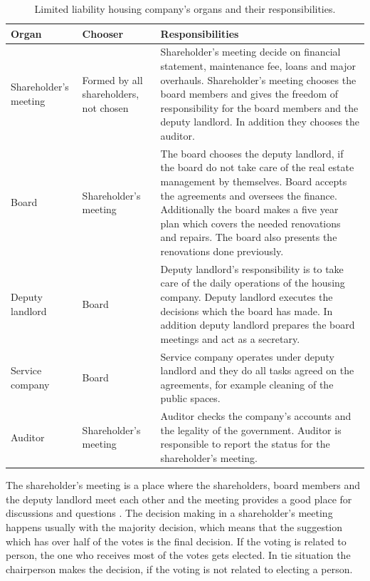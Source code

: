 \begin{table}
\begin{tabular}{|p{2.5cm}|p{2.5cm}|p{6.4cm}|} 
\hline %
\textbf{Organ} & \textbf{Chooser}  & \textbf{Responsibilities} \\ 
\hline 
Shareholder's meeting & Formed by all shareholders, not chosen & Shareholder's meeting decide on financial statement, maintenance fee, loans and major overhauls. Shareholder's meeting chooses the board members and gives the freedom of responsibility for the board members and the deputy landlord. In addition they chooses the auditor.\\ 
\hline
Board & Shareholder's meeting & The board chooses the deputy landlord, if the board do not take care of the real estate management by themselves. Board accepts the agreements and oversees the finance. Additionally the board makes a five year plan which covers the needed renovations and repairs. The board also presents the renovations done previously.\\
\hline
Deputy landlord & Board & Deputy landlord's responsibility is to take care of the daily operations of the housing company. Deputy landlord executes the decisions which the board has made. In addition deputy landlord prepares the board meetings and act as a secretary.\\
\hline
Service company & Board & Service company operates under deputy landlord and they do all tasks agreed on the agreements, for example cleaning of the public spaces.\\
\hline
Auditor & Shareholder's meeting & Auditor checks the company's accounts and the legality of the government. Auditor is responsible to report the status for the shareholder's meeting.\\
\hline
\end{tabular} %
\caption{Limited liability housing company's organs and their responsibilities. \parencite{RantanenViiala:2015}}
\label{table:responsibilities}
\end{table} %

The shareholder's meeting is a place where the shareholders, board members and the deputy landlord meet each other and the meeting provides a good place for discussions and questions \parencite{Hallintotapa:2017}. The decision making in a shareholder's meeting happens usually with the majority decision, which means that the suggestion which has over half of the votes is the final decision. If the voting is related to person, the one who receives most of the votes gets elected. In tie situation the chairperson makes the decision, if the voting is not related to electing a person. \parencite{RantanenViiala:2015}

